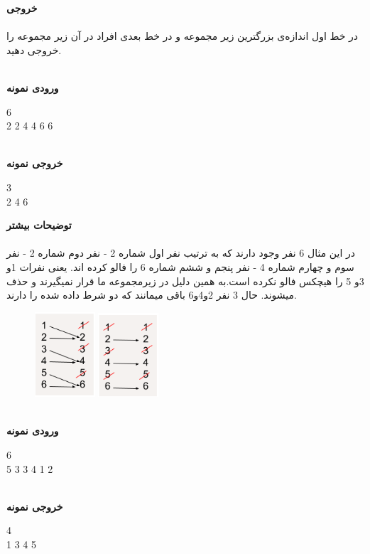 \documentclass[]{article}
\newcommand{\inputsample}[1]{
    ~\\
    \textbf{ورودی نمونه}
    ~\\
    \begin{tcolorbox}[breakable,boxrule=0pt]
        \begin{latin}
            \large{
                #1
            }
        \end{latin}
    \end{tcolorbox}
}
\newcommand{\outputsample}[1]{
    ~\\
    \textbf{خروجی نمونه}

    \begin{tcolorbox}[breakable,boxrule=0pt]
        \begin{latin}
            \large{
                #1
            }
        \end{latin}
    \end{tcolorbox}
}
\begin{document}
\textbf{خروجی}\\\\
در خط اول اندازه‌ی بزرگترین زیر مجموعه و در خط بعدی افراد در آن زیر مجموعه‌ را خروجی دهید.

\newpage
\inputsample{
6\\
2 2 4 4 6 6
}
\outputsample{
3\\
2 4 6
}
\vspace{1cm}
\textbf{توضیحات بیشتر}\\\\
در این مثال 6 نفر وجود دارند که به ترتیب نفر اول  شماره 2 - نفر دوم شماره 2 - نفر سوم و چهارم شماره 4 - نفر پنجم و ششم شماره 6 را فالو کرده اند. یعنی نفرات 1و 3و 5 را هیچکس فالو نکرده است.به همین دلیل در زیرمجموعه ما قرار نمیگیرند و حذف میشوند. حال 3 نفر 2و4و6 باقی میمانند که دو شرط داده شده را دارند.
\begin{figure}[h]
\centering
\includegraphics[width=0.2\textwidth]{social1.png}
\includegraphics[width=0.2\textwidth]{social2.png}
\end{figure}
\newpage
\inputsample{
6\\
5 3 3 4 1 2
}
\outputsample{
4\\
1 3 4 5
}
\end{document}
